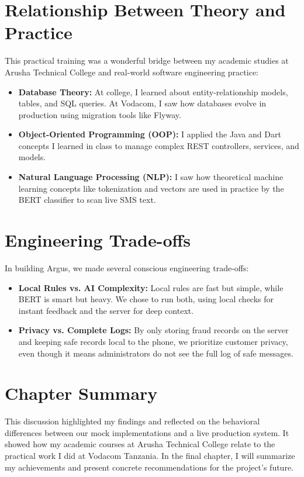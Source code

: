 \section{Relationship Between Theory and Practice}
This practical training was a wonderful bridge between my academic studies at Arusha Technical College and real-world software engineering practice:
\begin{itemize}
  \item \textbf{Database Theory:} At college, I learned about entity-relationship models, tables, and SQL queries. At Vodacom, I saw how databases evolve in production using migration tools like Flyway.
  \item \textbf{Object-Oriented Programming (OOP):} I applied the Java and Dart concepts I learned in class to manage complex REST controllers, services, and models.
  \item \textbf{Natural Language Processing (NLP):} I saw how theoretical machine learning concepts like tokenization and vectors are used in practice by the BERT classifier to scan live SMS text.
\end{itemize}

\section{Engineering Trade-offs}
In building Argus, we made several conscious engineering trade-offs:
\begin{itemize}
  \item \textbf{Local Rules vs. AI Complexity:} Local rules are fast but simple, while BERT is smart but heavy. We chose to run both, using local checks for instant feedback and the server for deep context.
  \item \textbf{Privacy vs. Complete Logs:} By only storing fraud records on the server and keeping safe records local to the phone, we prioritize customer privacy, even though it means administrators do not see the full log of safe messages.
\end{itemize}

\section{Chapter Summary}
This discussion highlighted my findings and reflected on the behavioral differences between our mock implementations and a live production system. It showed how my academic courses at Arusha Technical College relate to the practical work I did at Vodacom Tanzania. In the final chapter, I will summarize my achievements and present concrete recommendations for the project's future.
